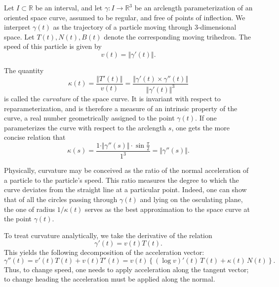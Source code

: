 \documentclass[12pt]{article}
\newcommand{\reals}{\mathbb{R}}
\begin{document}
Let $I\subset\reals$ be an interval, and let $\gamma:I\to\reals^3$ be
an arclength parameterization of an oriented space curve, assumed to
be regular, and free of points of inflection.  We interpret $\gamma(t)$ as
the trajectory of a particle moving through 3-dimensional space.  Let
$T(t), N(t), B(t)$ denote the corresponding moving trihedron.  The
speed of this particle is given by 
\[
   v(t) = \Vert \gamma'(t) \Vert.
\]

The quantity
\[ \kappa(t) = \frac{\Vert T'(t)\Vert}{v(t)} = 
               \frac{\Vert \gamma'(t)\times \gamma''(t)\Vert}
                     {\Vert \gamma'(t)\Vert^3}
\]
is called the
\emph{curvature} of the space curve.  It is invariant with respect to
reparameterization, and is therefore a measure of an intrinsic property
of the curve, a real number geometrically assigned to the point
$\gamma(t)$. If one parameterizes the curve with respect to the arclength $s$, one gets the more concise relation that
\[
   \kappa(s) = \frac{1\cdot\Vert\gamma''(s)\Vert\cdot\sin\frac{\pi}{2}}{1^3} 
             = \Vert\gamma''(s)\Vert.
\]

Physically, curvature may be conceived as the ratio of the normal
acceleration of a particle to the particle's speed.  This ratio
measures the degree to which the curve deviates from the straight line
at a particular point. Indeed, one can show
that of all the circles passing through $\gamma(t)$ and lying on the
osculating plane, the one of radius $1/\kappa(t)$ serves as the best
approximation to the space curve at the point $\gamma(t)$.

To treat curvature analytically, we take the derivative of the relation
\[ \gamma'(t) = v(t) T(t).\]
This yields the following
decomposition of the acceleration vector:
\[
  \gamma''(t) = v'(t) T(t) + v(t) T'(t)
              = v(t) \left\{ (\log v)'(t)\, T(t) + \kappa(t)\, N(t)\right\}.
\]
Thus, to change speed,
one needs to apply acceleration along the tangent vector; to change
heading the acceleration must be applied along the normal.
\end{document}
